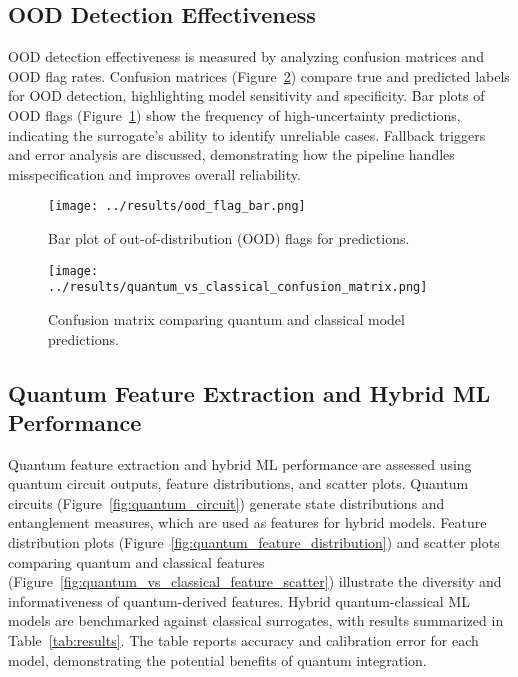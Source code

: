 \documentclass[12pt]{article}
\begin{document}
\subsection{OOD Detection Effectiveness}

OOD detection effectiveness is measured by analyzing confusion matrices and OOD flag rates. Confusion matrices (Figure~\ref{fig:quantum_vs_classical_confusion}) compare true and predicted labels for OOD detection, highlighting model sensitivity and specificity. Bar plots of OOD flags (Figure~\ref{fig:ood_flag_bar}) show the frequency of high-uncertainty predictions, indicating the surrogate's ability to identify unreliable cases. Fallback triggers and error analysis are discussed, demonstrating how the pipeline handles misspecification and improves overall reliability.

\begin{figure}[h!]
    \centering
    \texttt{[image: ../results/ood\_flag\_bar.png]}
    \caption{Bar plot of out-of-distribution (OOD) flags for predictions.}
    \label{fig:ood_flag_bar}
\end{figure}

\begin{figure}[h!]
    \centering
    \texttt{[image: ../results/quantum\_vs\_classical\_confusion\_matrix.png]}
    \caption{Confusion matrix comparing quantum and classical model predictions.}
    \label{fig:quantum_vs_classical_confusion}
\end{figure}

\subsection{Quantum Feature Extraction and Hybrid ML Performance}

Quantum feature extraction and hybrid ML performance are assessed using quantum circuit outputs, feature distributions, and scatter plots. Quantum circuits (Figure~\ref{fig:quantum_circuit}) generate state distributions and entanglement measures, which are used as features for hybrid models. Feature distribution plots (Figure~\ref{fig:quantum_feature_distribution}) and scatter plots comparing quantum and classical features (Figure~\ref{fig:quantum_vs_classical_feature_scatter}) illustrate the diversity and informativeness of quantum-derived features. Hybrid quantum-classical ML models are benchmarked against classical surrogates, with results summarized in Table~\ref{tab:results}. The table reports accuracy and calibration error for each model, demonstrating the potential benefits of quantum integration.
\end{document}
